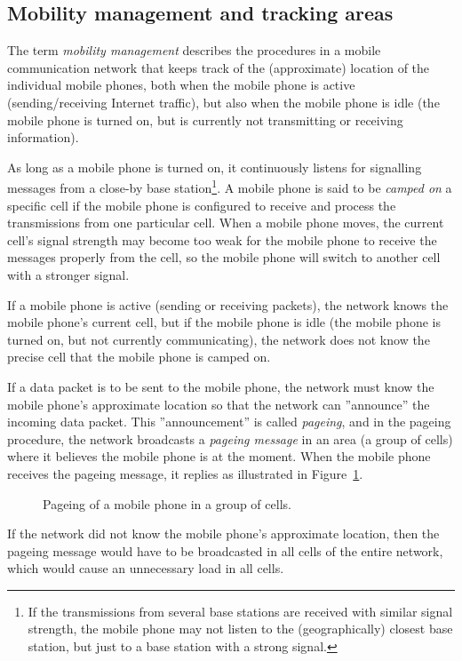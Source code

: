\subsection{Mobility management and tracking areas}
\label{sec:locationareas}
The term \emph{mobility management} describes the procedures in a mobile communication network that keeps track of the (approximate) location of the individual mobile phones, both when the mobile phone is active (\eg sending/receiving Internet traffic), but also when the mobile phone is idle (\ie the mobile phone is turned on, but is currently not transmitting or receiving information).

As long as a mobile phone is turned on, it continuously listens for signalling messages from a close-by base station\footnote{If the transmissions from several base stations are received with similar signal strength, the mobile phone may not listen to the (geographically) closest base station, but just to a base station with a strong signal.}. A mobile phone is said to be \emph{camped on} a specific cell if the mobile phone is configured to receive and process the transmissions from one particular cell. When a mobile phone moves, the current cell's signal strength may become too weak for the mobile phone to receive the messages properly from the cell, so the mobile phone will switch to another cell with a stronger signal.

If a mobile phone is active (\ie sending or receiving packets), the network knows the mobile phone's current cell, but if the mobile phone is idle (\ie the mobile phone is turned on, but not currently communicating), the network does not know the precise cell that the mobile phone is camped on.

If a data packet is to be sent to the mobile phone, the network must know the mobile phone's approximate location so that the network can ''announce'' the incoming data packet. This ''announcement'' is called \emph{pageing}, and in the pageing procedure, the network broadcasts a \emph{pageing message} in an area (a group of cells) where it believes the mobile phone is at the moment. When the mobile phone receives the pageing message, it replies as illustrated in Figure~\ref{fig:pageing}.
\begin{figure}[htbp]
\centering
{}
\caption{\label{fig:pageing}Pageing of a mobile phone in a group of cells.}
\end{figure}

If the network did not know the mobile phone's approximate location, then the pageing message would have to be broadcasted in all cells of the entire network, which would cause an unnecessary load in all cells.

